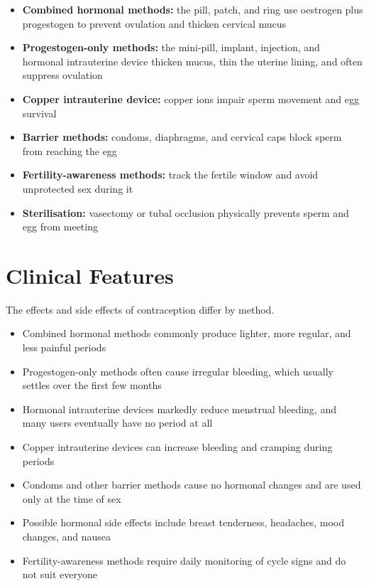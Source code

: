 \begin{itemize}
    \item \textbf{Combined hormonal methods:} the pill, patch, and ring use oestrogen plus progestogen to prevent ovulation and thicken cervical mucus
    \item \textbf{Progestogen-only methods:} the mini-pill, implant, injection, and hormonal intrauterine device thicken mucus, thin the uterine lining, and often suppress ovulation
    \item \textbf{Copper intrauterine device:} copper ions impair sperm movement and egg survival
    \item \textbf{Barrier methods:} condoms, diaphragms, and cervical caps block sperm from reaching the egg
    \item \textbf{Fertility-awareness methods:} track the fertile window and avoid unprotected sex during it
    \item \textbf{Sterilisation:} vasectomy or tubal occlusion physically prevents sperm and egg from meeting
\end{itemize}

\section*{Clinical Features}
The effects and side effects of contraception differ by method.

\begin{itemize}
    \item Combined hormonal methods commonly produce lighter, more regular, and less painful periods
    \item Progestogen-only methods often cause irregular bleeding, which usually settles over the first few months
    \item Hormonal intrauterine devices markedly reduce menstrual bleeding, and many users eventually have no period at all
    \item Copper intrauterine devices can increase bleeding and cramping during periods
    \item Condoms and other barrier methods cause no hormonal changes and are used only at the time of sex
    \item Possible hormonal side effects include breast tenderness, headaches, mood changes, and nausea
    \item Fertility-awareness methods require daily monitoring of cycle signs and do not suit everyone
\end{itemize}

